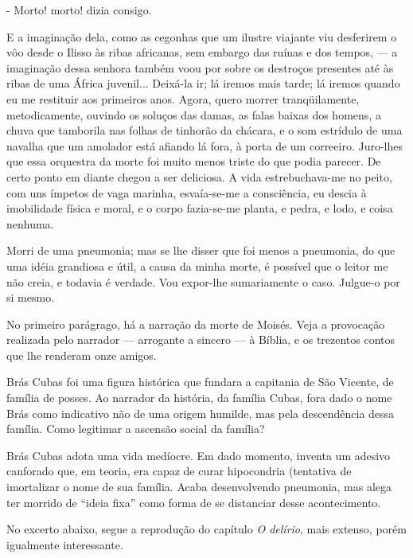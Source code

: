 \begin{corollary}[Capítulo I]
- Morto! morto! dizia consigo.

E a imaginação dela, como as cegonhas que um ilustre viajante viu desferirem o vôo desde o Ilisso às ribas africanas, sem embargo das ruínas e dos tempos, — a imaginação dessa senhora também voou por sobre os destroços presentes até às ribas de uma África juvenil... Deixá-la ir; lá iremos mais tarde; lá iremos quando eu me restituir aos primeiros anos. Agora, quero morrer tranqüilamente, metodicamente, ouvindo os soluços das damas, as falas baixas dos homens, a chuva que tamborila nas folhas de tinhorão da chácara, e o som estrídulo de uma navalha que um amolador está afiando lá fora, à porta de um correeiro. Juro-lhes que essa orquestra da morte foi muito menos triste do que podia parecer. De certo ponto em diante chegou a ser deliciosa. A vida estrebuchava-me no peito, com uns ímpetos de vaga marinha, esvaía-se-me a consciência, eu descia à imobilidade física e moral, e o corpo fazia-se-me planta, e pedra, e lodo, e coisa nenhuma.

Morri de uma pneumonia; mas se lhe disser que foi menos a pneumonia, do que uma idéia grandiosa e útil, a causa da minha morte, é possível que o leitor me não creia, e todavia é verdade. Vou expor-lhe sumariamente o caso. Julgue-o por si mesmo.
\end{corollary}

No primeiro parágrago, há a narração da morte de Moisés. Veja a provocação realizada pelo narrador — arrogante a sincero — à Bíblia, e os trezentos contos que lhe renderam onze amigos.

Brás Cubas foi uma figura histórica que fundara a capitania de São Vicente, de família de posses. Ao narrador da história, da família Cubas, fora dado o nome Brás como indicativo não de uma origem humilde, mas pela descendência dessa família. Como legitimar a ascensão social da família?

Brás Cubas adota uma vida medíocre. Em dado momento, inventa um adesivo canforado que, em teoria, era capaz de curar hipocondria (tentativa de imortalizar o nome de sua família. Acaba desenvolvendo pneumonia, mas alega ter morrido de ``ideia fixa'' como forma de se distanciar desse acontecimento.

No excerto abaixo, segue a reprodução do capítulo \textit{O delírio}, mais extenso, porém igualmente interessante.


